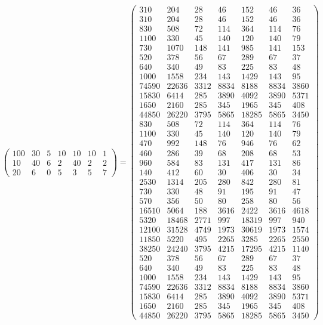 \documentclass{article}%
\begin{document}
\[\begin{pmatrix}
100&30&5&10&10&10&1\\%
10&40&6&2&40&2&2\\%
20&6&0&5&3&5&7%
\end{pmatrix} = \begin{pmatrix}%
310&204&28&46&152&46&36\\%
310&204&28&46&152&46&36\\%
830&508&72&114&364&114&76\\%
1100&330&45&140&120&140&79\\%
730&1070&148&141&985&141&153\\%
520&378&56&67&289&67&37\\%
640&340&49&83&225&83&48\\%
1000&1558&234&143&1429&143&95\\%
74590&22636&3312&8834&8188&8834&3860\\%
15830&6414&285&3890&4092&3890&5371\\%
1650&2160&285&345&1965&345&408\\%
44850&26220&3795&5865&18285&5865&3450\\%
830&508&72&114&364&114&76\\%
1100&330&45&140&120&140&79\\%
470&992&148&76&946&76&62\\%
460&286&39&68&208&68&53\\%
960&584&83&131&417&131&86\\%
140&412&60&30&406&30&34\\%
2530&1314&205&280&842&280&81\\%
730&330&48&91&195&91&47\\%
570&356&50&80&258&80&56\\%
16510&5064&188&3616&2422&3616&4618\\%
5320&18468&2771&997&18319&997&940\\%
12100&31528&4749&1973&30619&1973&1574\\%
11850&5220&495&2265&3285&2265&2550\\%
38250&24240&3795&4215&17295&4215&1140\\%
520&378&56&67&289&67&37\\%
640&340&49&83&225&83&48\\%
1000&1558&234&143&1429&143&95\\%
74590&22636&3312&8834&8188&8834&3860\\%
15830&6414&285&3890&4092&3890&5371\\%
1650&2160&285&345&1965&345&408\\%
44850&26220&3795&5865&18285&5865&3450%
\end{pmatrix}%
\]
\end{document}
